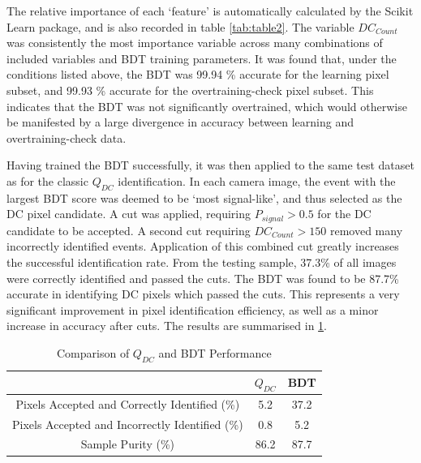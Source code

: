 \documentclass[]{article}
\begin{document}
The relative importance of each \textquoteleft feature' is automatically calculated by the Scikit Learn package, and is also recorded in table \ref{tab:table2}. The variable $DC_{Count}$ was consistently the most importance variable across many combinations of included variables and BDT training parameters. It was found that, under the conditions listed above, the BDT was 99.94 \% accurate for the learning pixel subset, and 99.93 \%  accurate for the overtraining-check pixel subset. This indicates that the BDT was not significantly overtrained, which would otherwise be manifested by a large divergence in accuracy between learning and overtraining-check data.

Having trained the BDT successfully, it was then applied to the same test dataset as for the classic $Q_{DC}$ identification. In each camera image, the event with the largest BDT score was deemed to be \textquoteleft most signal-like', and thus selected as the DC pixel candidate. A cut was applied, requiring $P_{signal} > 0.5$ for the DC candidate to be accepted. A second cut requiring $DC_{Count} > 150$ removed many incorrectly identified events. Application of this combined cut greatly increases the successful identification rate. From the testing sample, 37.3\% of all images were correctly identified and passed the cuts. The BDT was found to be 87.7\% accurate in identifying DC pixels which passed the cuts. This represents a very significant improvement in pixel identification efficiency, as well as a minor increase in accuracy after cuts. The results are summarised in \ref{tab:table3}.

\begin{table}[h!]
  \centering
  \caption{Comparison of $Q_{DC}$ and BDT Performance}
  \label{tab:table3}
  \begin{tabular}{ccc}
    \toprule
    & $Q_{DC}$ & BDT\\
    \midrule
    Pixels Accepted and Correctly Identified (\%) & 5.2 & 37.2\\
   Pixels Accepted and Incorrectly Identified (\%) & 0.8 & 5.2\\
    Sample Purity (\%) & 86.2 & 87.7\\
  \end{tabular}
\end{table}
\end{document}
